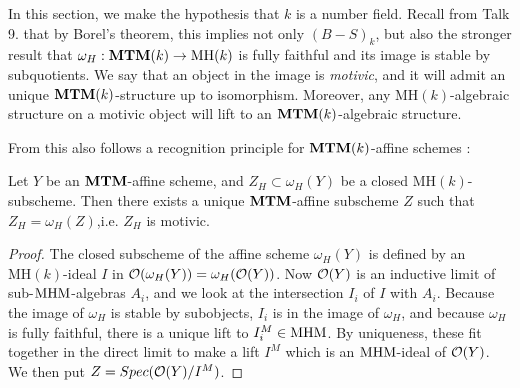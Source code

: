 In this section, we make the hypothesis that $k$ is a number field. Recall from Talk 9. that by Borel's theorem, this implies not only $(B-S)_k$, but also the stronger result that $\omega_H:\mathbf{MTM}(k)\rightarrow \mathrm{MH}(k)$ is fully faithful and its image is stable by subquotients. We say that an object in the image is \emph{motivic}, and it will admit an unique $\mathbf{MTM}(k)$-structure up to isomorphism. Moreover, any $\mathrm{MH}(k)$-algebraic structure on a motivic object will lift to an $\mathbf{MTM}(k)$-algebraic structure.

From this also follows a recognition principle for $\mathbf{MTM}(k)$-affine schemes :

\begin{prop}
Let $Y$ be an $\mathbf{MTM}$-affine scheme, and $Z_H\subset \omega_H(Y)$ be a closed $\mathrm{MH}(k)$-subscheme. Then there exists a unique $\mathbf{MTM}$-affine subscheme $Z$ such that $Z_H=\omega_H(Z)$,i.e. $Z_H$ is motivic.
\end{prop}
\begin{proof}
The closed subscheme of the affine scheme $\omega_H(Y)$ is defined by an $\mathrm{MH}(k)$-ideal $I$ in $\mathcal{O}(\omega_H(Y))=\omega_H(\mathcal{O}(Y))$. Now $\mathcal{O}(Y)$ is an inductive limit of sub-$\mathrm{MHM}$-algebras $A_i$, and we look at the intersection $I_i$ of $I$ with $A_i$. Because the image of $\omega_H$ is stable by subobjects, $I_i$ is in the image of $\omega_H$, and because $\omega_H$ is fully faithful, there is a unique lift to $I^M_i\in \mathrm{MHM}$. By uniqueness, these fit together in the direct limit to make a lift $I^M$ which is an $\mathrm{MHM}$-ideal of $\mathcal{O}(Y)$. We then put $Z=Spec(\mathcal{O}(Y)/I^M)$. 
\end{proof}

